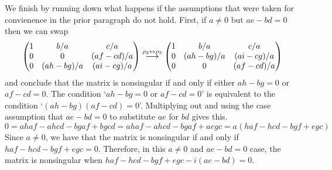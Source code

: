 \begin{exercises}
\begin{answer}
      We finish by running down what happens if the assumptions that were
      taken for convienence in the prior paragraph do not hold.
      First, if \( a\neq 0 \) but \( ae-bd=0 \) then we can swap
      \begin{equation*}
        \begin{pmatrix}
           1   &b/a           &c/a           \\
           0   &0             &(af-cd)/a     \\
           0   &(ah-bg)/a     &(ai-cg)/a
         \end{pmatrix}                                  
        \mathrel{ \mathop{\longrightarrow}\limits^{\rho_2\leftrightarrow\rho_3\mathstrut}_{ \begin{subarray}{l} \relax \end{subarray}}}
        \begin{pmatrix}
           1   &b/a           &c/a           \\
           0   &(ah-bg)/a     &(ai-cg)/a     \\
           0   &0             &(af-cd)/a
         \end{pmatrix}
      \end{equation*}
      and conclude that the matrix is nonsingular if and only if either
      \( ah-bg=0 \) or \( af-cd=0 \).
      The condition `\( ah-bg=0 \) or \( af-cd=0 \)' is equivalent to
      the condition `\( (ah-bg)(af-cd)=0 \)'.
      Multiplying out and using the case assumption that $ae-bd=0$
      to substitute $ae$ for $bd$ gives this.
      \begin{equation*}
         0=ahaf-ahcd-bgaf+bgcd
          =ahaf-ahcd-bgaf+aegc
          =a(haf-hcd-bgf+egc)
      \end{equation*}
      Since \( a\neq 0 \), we have that the matrix
      is nonsingular if and only if \( haf-hcd-bgf+egc=0 \).
      Therefore, in this \( a\neq 0 \) and \( ae-bd=0 \) case, 
      the matrix is nonsingular when
      \( haf-hcd-bgf+egc-i(ae-bd)=0 \).


\end{answer}
\end{exercises}
